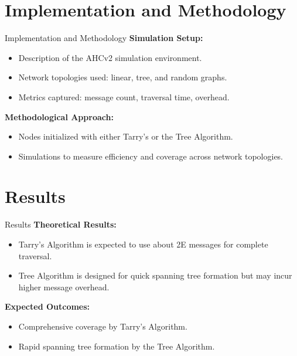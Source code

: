 \documentclass[11pt]{beamer}  %
\begin{document}
\section{Implementation and Methodology}
\begin{frame}{Implementation and Methodology}
    \textbf{Simulation Setup:}
    \begin{itemize}
        \item Description of the AHCv2 simulation environment.
        \item Network topologies used: linear, tree, and random graphs.
        \item Metrics captured: message count, traversal time, overhead.
    \end{itemize}
    \textbf{Methodological Approach:}
    \begin{itemize}
        \item Nodes initialized with either Tarry's or the Tree Algorithm.
        \item Simulations to measure efficiency and coverage across network topologies.
    \end{itemize}
\end{frame}

\section{Results}
\begin{frame}{Results}
    \textbf{Theoretical Results:}
    \begin{itemize}
        \item Tarry's Algorithm is expected to use about 2E messages for complete traversal.
        \item Tree Algorithm is designed for quick spanning tree formation but may incur higher message overhead.
    \end{itemize}
    \textbf{Expected Outcomes:}
    \begin{itemize}
        \item Comprehensive coverage by Tarry's Algorithm.
        \item Rapid spanning tree formation by the Tree Algorithm.
    \end{itemize}
\end{frame}
\end{document}
